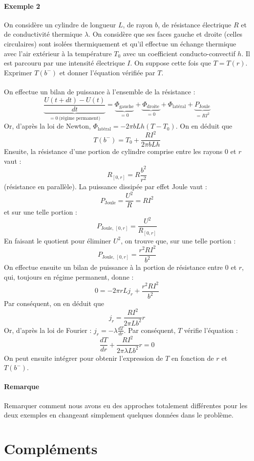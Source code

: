 \documentclass[french]{book}
\theoremstyle{plain}
\theoremstyle{definition}
\theoremstyle{remark}
\begin{document}
\paragraph{Exemple 2}
On considère un cylindre de longueur $L$, de rayon $b$, de résistance électrique $R$ et de conductivité thermique $\lambda$. On considère que ses faces gauche et droite (celles circulaires) sont isolées thermiquement et qu'il effectue un échange thermique avec l'air extérieur à la température $T_0$ avec un coefficient conducto-convectif $h$. Il est parcouru par une intensité électrique $I$. On suppose cette fois que $T=T(r)$. Exprimer $T(b^-)$ et donner l'équation vérifiée par $T$. \\ \\ On effectue un bilan de puissance à l'ensemble de la résistance : 
$$\underbrace{\frac{U(t+dt)-U(t)}{dt}}_{=0 \ \text{(régime permanent)}}=\underbrace{\Phi_{\text{gauche}}}_{=0}+\underbrace{\Phi_{\text{droite}}}_{=0}+\Phi_\text{latéral}+\underbrace{P_\text{Joule}}_{=RI^2}$$
Or, d'après la loi de Newton, $\Phi_\text{latéral}=-2\pi bLh(T-T_0)$. On en déduit que $$T(b^-)=T_0+\frac{RI^2}{2\pi bLh}$$ Ensuite, la résistance d'une portion de cylindre comprise entre les rayons $0$ et $r$ vaut : $$R_{[0,r]}=R\frac{b^2}{r^2}$$ (résistance en parallèle). La puissance dissipée par effet Joule vaut : $$P_\text{Joule}=\frac{U^2}{R}=RI^2$$ et sur une telle portion : $$P_{\text{Joule, }[0,r]}=\frac{U^2}{R_{[0,r]}}$$ En faisant le quotient pour éliminer $U^2$, on trouve que, sur une telle portion : $$P_{\text{Joule, }[0,r]}=\frac{r^2RI^2}{b^2}$$On effectue ensuite un bilan de puissance à la portion de résistance entre $0$ et $r$, qui, toujours en régime permanent, donne : $$0=-2\pi rLj_r+\frac{r^2RI^2}{b^2}$$ Par conséquent, on en déduit que $$j_r=\frac{RI^2}{2\pi Lb^2}r$$ Or, d'après la loi de Fourier : $j_r=\displaystyle -\lambda\frac{dT}{dr}$. Par conséquent, $T$ vérifie l'équation : $$\frac{dT}{dr}+\frac{RI^2}{2\pi\lambda Lb^2}r=0$$ On peut ensuite intégrer pour obtenir l'expression de $T$ en fonction de $r$ et $T(b^-)$.
\paragraph{Remarque} Remarquer comment nous avons eu des approches totalement différentes pour les deux exemples en changeant simplement quelques données dans le problème.
\section{Compléments}
\end{document}
